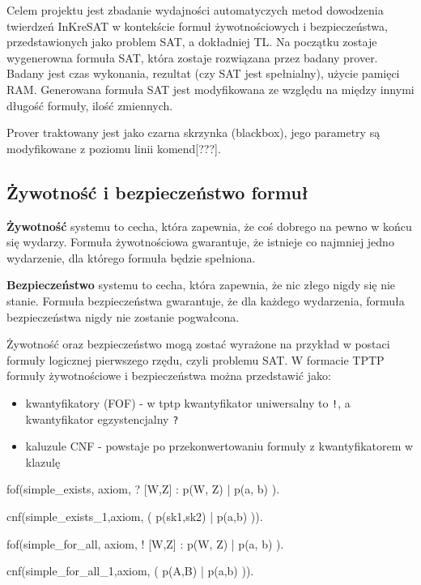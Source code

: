 \documentclass[a4paper,12pt]{article}
\begin{document}
Celem projektu jest zbadanie wydajności automatyczych metod dowodzenia twierdzeń InKreSAT w kontekście formuł żywotnościowych i bezpieczeństwa, przedstawionych jako problem \gls{SAT}, a dokładniej \gls{TL}. Na początku zostaje wygenerowna formuła \gls{SAT}, która zostaje rozwiązana przez badany prover. Badany jest czas wykonania, rezultat (czy \gls{SAT} jest spełnialny), użycie pamięci RAM.  Generowana formuła \gls{SAT} jest modyfikowana ze względu na między innymi długość formuły, ilość zmiennych.

Prover traktowany jest jako czarna skrzynka (blackbox), jego parametry są modyfikowane z poziomu linii komend[???].

\subsection{Żywotność i bezpieczeństwo formuł}

\textbf{Żywotność} systemu to cecha, która zapewnia, że coś dobrego na pewno w końcu się wydarzy. Formuła żywotnościowa gwarantuje, że istnieje co najmniej jedno wydarzenie, dla którego formuła będzie spełniona.

\textbf{Bezpieczeństwo} systemu to cecha, która zapewnia, że nic złego nigdy się nie stanie. Formuła bezpieczeństwa gwarantuje, że dla każdego wydarzenia, formuła bezpieczeństwa nigdy nie zostanie pogwałcona.

Żywotność oraz bezpieczeństwo mogą zostać wyrażone na przykład w postaci formuły logicznej pierwszego rzędu, czyli problemu SAT.
W formacie TPTP formuły żywotnościowe i bezpieczeństwa można przedstawić jako:
\begin{itemize}
  \item kwantyfikatory (\gls{FOF}) - w tptp kwantyfikator uniwersalny to \texttt{!}, a kwantyfikator egzystencjalny \texttt{?}
  \item kaluzule \gls{CNF} - powstaje po przekonwertowaniu formuły z kwantyfikatorem w klazulę
\end{itemize}

\begin{tptpcode}
fof(simple_exists, axiom,
 ? [W,Z] :  p(W, Z) | p(a, b)
  ).

cnf(simple_exists_1,axiom,
    ( p(sk1,sk2) | p(a,b) )).
\end{tptpcode}

\begin{tptpcode}
fof(simple_for_all, axiom,
 ! [W,Z] :  p(W, Z) | p(a, b)
  ).

cnf(simple_for_all_1,axiom,
    ( p(A,B) | p(a,b) )).
\end{tptpcode}
\end{document}
